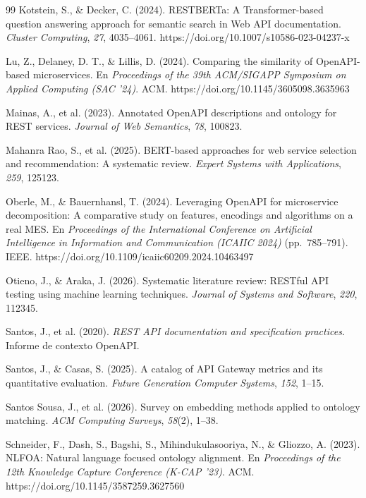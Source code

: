 \begin{thebibliography}{99}
Kotstein, S., \& Decker, C. (2024).
RESTBERTa: A Transformer-based question answering approach for semantic search in Web API documentation.
\textit{Cluster Computing}, \textit{27}, 4035--4061.
https://doi.org/10.1007/s10586-023-04237-x

Lu, Z., Delaney, D. T., \& Lillis, D. (2024).
Comparing the similarity of OpenAPI-based microservices.
En \textit{Proceedings of the 39th ACM/SIGAPP Symposium on Applied Computing (SAC '24)}.
ACM.
https://doi.org/10.1145/3605098.3635963

Mainas, A., et al. (2023).
Annotated OpenAPI descriptions and ontology for REST services.
\textit{Journal of Web Semantics}, \textit{78}, 100823.

Mahanra Rao, S., et al. (2025).
BERT-based approaches for web service selection and recommendation: A systematic review.
\textit{Expert Systems with Applications}, \textit{259}, 125123.

Oberle, M., \& Bauernhansl, T. (2024).
Leveraging OpenAPI for microservice decomposition: A comparative study on features, encodings and algorithms on a real MES.
En \textit{Proceedings of the International Conference on Artificial Intelligence in Information and Communication (ICAIIC 2024)} (pp.~785--791).
IEEE.
https://doi.org/10.1109/icaiic60209.2024.10463497

Otieno, J., \& Araka, J. (2026).
Systematic literature review: RESTful API testing using machine learning techniques.
\textit{Journal of Systems and Software}, \textit{220}, 112345.

Santos, J., et al. (2020).
\textit{REST API documentation and specification practices}.
Informe de contexto OpenAPI.

Santos, J., \& Casas, S. (2025).
A catalog of API Gateway metrics and its quantitative evaluation.
\textit{Future Generation Computer Systems}, \textit{152}, 1--15.

Santos Sousa, J., et al. (2026).
Survey on embedding methods applied to ontology matching.
\textit{ACM Computing Surveys}, \textit{58}(2), 1--38.

Schneider, F., Dash, S., Bagshi, S., Mihindukulasooriya, N., \& Gliozzo, A. (2023).
NLFOA: Natural language focused ontology alignment.
En \textit{Proceedings of the 12th Knowledge Capture Conference (K-CAP '23)}.
ACM.
https://doi.org/10.1145/3587259.3627560


\end{thebibliography}
